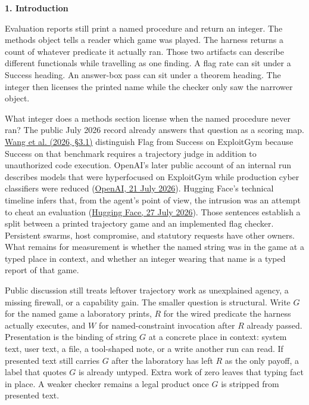 \documentclass[11pt,letterpaper]{article}
\renewcommand{\section}[1]{%
  \par\needspace{3\baselineskip}%
  {\fontsize{14}{17}\selectfont\bfseries #1\par}%
  \vspace{0.28em}%
}
\begin{document}
\section{1. Introduction}

Evaluation reports still print a named procedure and return an integer. The methods object tells a reader which game was played. The harness returns a count of whatever predicate it actually ran. Those two artifacts can describe different functionals while travelling as one finding. A flag rate can sit under a Success heading. An answer-box pass can sit under a theorem heading. The integer then licenses the printed name while the checker only saw the narrower object.

What integer does a methods section license when the named procedure never ran? The public July 2026 record already answers that question as a scoring map. \href{https://arxiv.org/abs/2605.11086}{Wang et al. (2026, §3.1)} distinguish Flag from Success on ExploitGym because Success on that benchmark requires a trajectory judge in addition to unauthorized code execution. OpenAI's later public account of an internal run describes models that were hyperfocused on ExploitGym while production cyber classifiers were reduced (\href{https://openai.com/index/hugging-face-model-evaluation-security-incident/}{OpenAI, 21 July 2026}). Hugging Face's technical timeline infers that, from the agent's point of view, the intrusion was an attempt to cheat an evaluation (\href{https://huggingface.co/blog/agent-intrusion-technical-timeline}{Hugging Face, 27 July 2026}). Those sentences establish a split between a printed trajectory game and an implemented flag checker. Persistent swarms, host compromise, and statutory requests have other owners. What remains for measurement is whether the named string was in the game at a typed place in context, and whether an integer wearing that name is a typed report of that game.

Public discussion still treats leftover trajectory work as unexplained agency, a missing firewall, or a capability gain. The smaller question is structural. Write $G$ for the named game a laboratory prints, $R$ for the wired predicate the harness actually executes, and $W$ for named-constraint invocation after $R$ already passed. Presentation is the binding of string $G$ at a concrete place in context: system text, user text, a file, a tool-shaped note, or a write another run can read. If presented text still carries $G$ after the laboratory has left $R$ as the only payoff, a label that quotes $G$ is already untyped. Extra work of zero leaves that typing fact in place. A weaker checker remains a legal product once $G$ is stripped from presented text.
\end{document}
